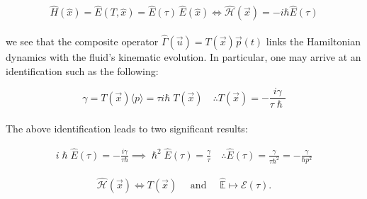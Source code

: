 \documentclass{article}
\begin{document}
\[
\hat{H}(\hat{x}) = \hat{E}(T, \hat{x}) = \hat{E}(\tau)\, \hat{E}(\hat{x}) \iff \hat{\mathcal{H}}(\vec x) = -i\hbar\hat{E}(\tau)
\] \\ 
we see that the composite operator $\hat{\Gamma}(\vec u) = T(\vec x)\vec p(t) $ links the Hamiltonian dynamics with the fluid's kinematic evolution. In particular, one may arrive at an identification such as the following: 

\[
\gamma = T(\vec x)\langle p \rangle = \tau i\hbar \; T(\vec x) \quad \therefore T(\vec x) = -\frac{i\gamma}{\tau\hslash}
\] \\
The above identification leads to two significant results:

\begin{align}
    i\hslash \hat E(\tau) = -\frac{i\gamma}{\tau \hbar} \implies \hslash^{2} \hat E(\tau) = \frac{\gamma}{\tau } \quad \therefore \hat E(\tau) = \frac{\gamma}{\tau \hbar^{2}} = -\frac{\gamma}{\hbar p^{2}}
\end{align} 

\begin{align}
    \hat{\mathcal{H}}(\vec x) \iff T(\vec x) \quad \text{ and } \quad \hat{\mathbb{E}} \mapsto \mathcal{E}(\tau). 
\end{align}\\ 






\end{document}
